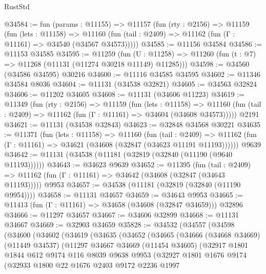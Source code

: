 \begin{lexlean}{RustStd}
\begin{coremodule}
@34584 := fun (params : @11155) =>
  @11157
    (fun (rty : @2156) =>
    @11159
      (fun (lets : @11158) =>
      @11160 (fun (tail : @2409) => @11162 (fun (Γ : @11161) => @34540 (@34567 @34573)))))
@34585 := @11156 @34584
@34586 := @11153 @34585
@34595 := @11259
    (fun (U : @11258) => @11260 (fun (t : @7) => @11268 (@11131 (@11274 @30218 @11149) @11285)))
@34598 := @34560 (@34586 @34595) @30216
@34600 := @11116 @34585 @34595
@34602 := @11346 @34584 @8036
@34604 := @11131 (@34538 @32821)
@34605 := @34563 @32824
@34606 := @11202 @34605
@34608 := @11131 (@34606 @11223)
@34619 := @11349
    (fun (rty : @2156) =>
    @11159
      (fun (lets : @11158) =>
      @11160 (fun (tail : @2409) => @11162 (fun (Γ : @11161) => @34604 (@34608 @34573)))))
    @2191
@34621 := @11131 (@34538 @32843)
@34623 := @32848 @34568 @30221
@34635 := @11371
    (fun (lets : @11158) =>
    @11160
      (fun (tail : @2409) =>
      @11162 (fun (Γ : @11161) => @34621 (@34608 (@32847 (@34623 @11191 @11193))))))
    @9639
@34642 := @11131 (@34538 (@11181 (@32819 (@32840 (@11190 (@9640 @11193))))))
@34643 := @34623 @9639
@34652 := @11395
    (fun (tail : @2409) => @11162 (fun (Γ : @11161) => @34642 (@34608 (@32847 (@34643 @11193)))))
    @9953
@34657 := @34538 (@11181 (@32819 (@32840 (@11190 @9954))))
@34658 := @11131 @34657
@34659 := @34643 @9953
@34665 := @11413 (fun (Γ : @11161) => @34658 (@34608 (@32847 @34659))) @32896
@34666 := @11297 @34657
@34667 := @34606 @32899
@34668 := @11131 @34667
@34669 := @32903 @34659
@35828 := @34532
    (@34557
      (@34598
        (@34600
          (@34602
            (@34619
              (@34635
                (@34652
                  (@34665
                    (@34666
                      (@34668 @34669)
                      (@11449 @34537)
                      (@11297
                        @34667
                        @34669
                        (@11454 @34605)
                        (@32917
                          @1801
                          @1844
                          @612
                          @9174
                          @116
                          @8039
                          @9638
                          @9953
                          (@32927
                            @1801
                            @1676
                            @9174
                            (@32933
                              @1800
                              @22
                              @1676
                              @2403
                              @9172
                              @2236
                              @1997

\end{coremodule}
\end{lexlean}
